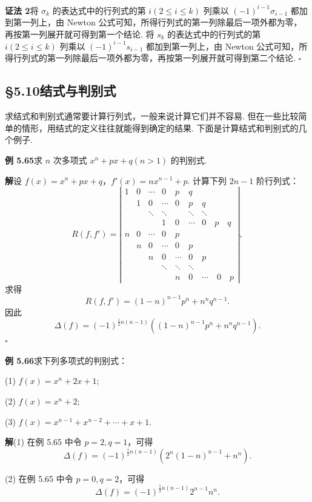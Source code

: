 \documentclass[UTF8,12pt,a4paper,fontset=fandol]{ctexart}
\begin{document}
\noindent\textbf{证法 2}\quad 将 $\sigma_k$ 的表达式中的行列式的第 $i(2\le i\le k)$ 列乘以 $(-1)^{i-1}\sigma_{i-1}$ 都加到第一列上，由 Newton 公式可知，所得行列式的第一列除最后一项外都为零，再按第一列展开就可得到第一个结论. 将 $s_k$ 的表达式中的行列式的第 $i(2\le i\le k)$ 列乘以 $(-1)^{i-1}s_{i-1}$ 都加到第一列上，由 Newton 公式可知，所得行列式的第一列除最后一项外都为零，再按第一列展开就可得到第二个结论. \hfill $\square$

\subsection*{§5.10\quad 结式与判别式}

求结式和判别式通常要计算行列式，一般来说计算它们并不容易. 但在一些比较简单的情形，用结式的定义往往就能得到确定的结果. 下面是计算结式和判别式的几个例子.

\noindent\textbf{例 5.65}\quad 求 $n$ 次多项式 $x^n+px+q(n>1)$ 的判别式.

\noindent\textbf{解}\quad 设 $f(x)=x^n+px+q$，$f'(x)=nx^{n-1}+p$. 计算下列 $2n-1$ 阶行列式：
\[
R(f,f')=
\left|\begin{array}{ccccccc}
1 & 0 & \cdots & 0 & p & q & \\
 & 1 & 0 & \cdots & 0 & p & q\\
 & & \ddots & \ddots & & \ddots & \ddots\\
 & & & 1 & 0 & \cdots & 0\quad p\quad q\\
n & 0 & \cdots & 0 & p & & \\
 & n & 0 & \cdots & 0 & p & \\
 & & n & 0 & \cdots & 0 & p\\
 & & & \ddots & \ddots & \ddots & \\
 & & & & n & 0 & \cdots\quad 0\quad p
\end{array}\right|,
\]
求得
\[
R(f,f')=(1-n)^{n-1}p^n+n^nq^{n-1}.
\]
因此
\[
\Delta(f)=(-1)^{\frac12 n(n-1)}\left((1-n)^{n-1}p^n+n^nq^{n-1}\right).
\]
\hfill $\square$

\noindent\textbf{例 5.66}\quad 求下列多项式的判别式：

(1) $f(x)=x^n+2x+1$;

(2) $f(x)=x^n+2$;

(3) $f(x)=x^{n-1}+x^{n-2}+\cdots+x+1$.

\noindent\textbf{解}\quad (1) 在例 5.65 中令 $p=2,q=1$，可得
\[
\Delta(f)=(-1)^{\frac12 n(n-1)}\left(2^n(1-n)^{n-1}+n^n\right).
\]

(2) 在例 5.65 中令 $p=0,q=2$，可得
\[
\Delta(f)=(-1)^{\frac12 n(n-1)}2^{n-1}n^n.
\]
\end{document}
